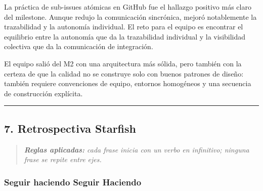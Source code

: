 \documentclass[11pt,a4paper]{article}
\begin{document}
La práctica de sub-issues atómicas en GitHub fue el hallazgo positivo más claro del milestone. Aunque redujo la comunicación sincrónica, mejoró notablemente la trazabilidad y la autonomía individual. El reto para el equipo es encontrar el equilibrio entre la autonomía que da la trazabilidad individual y la visibilidad colectiva que da la comunicación de integración.

El equipo salió del M2 con una arquitectura más sólida, pero también con la certeza de que la calidad no se construye solo con buenos patrones de diseño: también requiere convenciones de equipo, entornos homogéneos y una secuencia de construcción explícita.

\vspace{0.6em}\hrule\vspace{0.8em}

\subsection{7. Retrospectiva Starfish}

\begin{quote}\itshape
\textbf{Reglas aplicadas:} cada frase inicia con un verbo en infinitivo; ninguna frase se repite entre ejes.\\
\end{quote}

\subsubsection{Seguir haciendo Seguir Haciendo}
\end{document}
